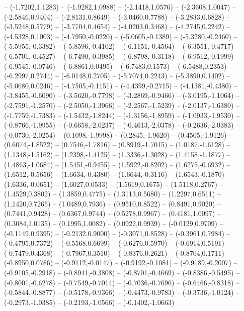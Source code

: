 {	-- (-1.7202,1.1283)
	-- (-1.9282,1.0988)
	-- (-2.1418,1.0576)
	-- (-2.3608,1.0047)
	-- (-2.5846,0.9404)
	-- (-2.8131,0.8649)
	-- (-3.0460,0.7788)
	-- (-3.2833,0.6828)
	-- (-3.5248,0.5779)
	-- (-3.7704,0.4654)
	-- (-4.0203,0.3468)
	-- (-4.2745,0.2242)
	-- (-4.5328,0.1003)
	-- (-4.7950,-0.0220)
	-- (-5.0605,-0.1389)
	-- (-5.3280,-0.2460)
	-- (-5.5955,-0.3382)
	-- (-5.8596,-0.4102)
	-- (-6.1151,-0.4564)
	-- (-6.3551,-0.4717)
	-- (-6.5701,-0.4527)
	-- (-6.7490,-0.3985)
	-- (-6.8798,-0.3118)
	-- (-6.9512,-0.1999)
	-- (-6.9545,-0.0746)
	-- (-6.8861,0.0495)
	-- (-6.7483,0.1573)
	-- (-6.5488,0.2353)
	-- (-6.2997,0.2744)
	-- (-6.0148,0.2705)
	-- (-5.7074,0.2243)
	-- (-5.3890,0.1402)
	-- (-5.0680,0.0246)
	-- (-4.7505,-0.1151)
	-- (-4.4399,-0.2715)
	-- (-4.1381,-0.4380)
	-- (-3.8455,-0.6090)
	-- (-3.5620,-0.7798)
	-- (-3.2869,-0.9466)
	-- (-3.0195,-1.1064)
	-- (-2.7591,-1.2570)
	-- (-2.5050,-1.3966)
	-- (-2.2567,-1.5239)
	-- (-2.0137,-1.6380)
	-- (-1.7759,-1.7383)
	-- (-1.5432,-1.8244)
	-- (-1.3156,-1.8959)
	-- (-1.0933,-1.9530)
	-- (-0.8766,-1.9955)
	-- (-0.6658,-2.0237)
	-- (-0.4613,-2.0378)
	-- (-0.2636,-2.0383)
	-- (-0.0730,-2.0254)
	-- (0.1098,-1.9998)
	-- (0.2845,-1.9620)
	-- (0.4505,-1.9126)
	-- (0.6074,-1.8522)
	-- (0.7546,-1.7816)
	-- (0.8919,-1.7015)
	-- (1.0187,-1.6128)
	-- (1.1348,-1.5162)
	-- (1.2398,-1.4125)
	-- (1.3336,-1.3028)
	-- (1.4158,-1.1877)
	-- (1.4863,-1.0684)
	-- (1.5451,-0.9455)
	-- (1.5922,-0.8202)
	-- (1.6275,-0.6932)
	-- (1.6512,-0.5656)
	-- (1.6634,-0.4380)
	-- (1.6644,-0.3116)
	-- (1.6543,-0.1870)
	-- (1.6336,-0.0651)
	-- (1.6027,0.0533)
	-- (1.5619,0.1675)
	-- (1.5118,0.2767)
	-- (1.4529,0.3802)
	-- (1.3859,0.4775)
	-- (1.3113,0.5680)
	-- (1.2297,0.6511)
	-- (1.1420,0.7265)
	-- (1.0489,0.7936)
	-- (0.9510,0.8522)
	-- (0.8491,0.9020)
	-- (0.7441,0.9428)
	-- (0.6367,0.9744)
	-- (0.5278,0.9967)
	-- (0.4181,1.0097)
	-- (0.3084,1.0135)
	-- (0.1995,1.0082)
	-- (0.0922,0.9939)
	-- (-0.0129,0.9709)
	-- (-0.1149,0.9395)
	-- (-0.2132,0.9000)
	-- (-0.3071,0.8528)
	-- (-0.3961,0.7984)
	-- (-0.4795,0.7372)
	-- (-0.5568,0.6699)
	-- (-0.6276,0.5970)
	-- (-0.6914,0.5191)
	-- (-0.7479,0.4368)
	-- (-0.7967,0.3510)
	-- (-0.8376,0.2621)
	-- (-0.8704,0.1711)
	-- (-0.8950,0.0786)
	-- (-0.9112,-0.0147)
	-- (-0.9192,-0.1081)
	-- (-0.9189,-0.2007)
	-- (-0.9105,-0.2918)
	-- (-0.8941,-0.3808)
	-- (-0.8701,-0.4669)
	-- (-0.8386,-0.5495)
	-- (-0.8001,-0.6278)
	-- (-0.7549,-0.7014)
	-- (-0.7036,-0.7696)
	-- (-0.6466,-0.8318)
	-- (-0.5844,-0.8877)
	-- (-0.5178,-0.9366)
	-- (-0.4473,-0.9783)
	-- (-0.3736,-1.0124)
	-- (-0.2973,-1.0385)
	-- (-0.2193,-1.0566)
	-- (-0.1402,-1.0663)
}
